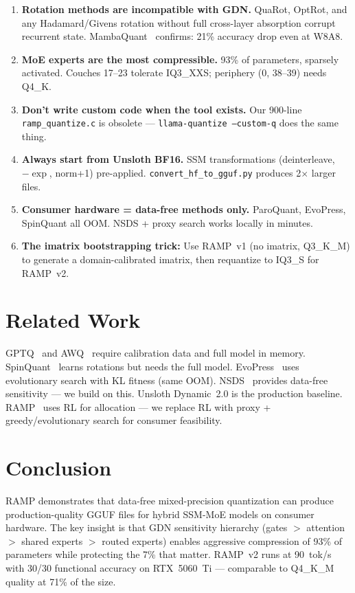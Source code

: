 \documentclass[10pt,a4paper]{article}
\begin{document}
\begin{enumerate}
  \item \textbf{Rotation methods are incompatible with GDN.} QuaRot, OptRot, and any Hadamard/Givens rotation without full cross-layer absorption corrupt recurrent state. MambaQuant~\cite{mambaquant2024} confirms: 21\% accuracy drop even at W8A8.
  \item \textbf{MoE experts are the most compressible.} 93\% of parameters, sparsely activated. Couches 17--23 tolerate IQ3\_XXS; periphery (0, 38--39) needs Q4\_K.
  \item \textbf{Don't write custom code when the tool exists.} Our 900-line \texttt{ramp\_quantize.c} is obsolete --- \texttt{llama-quantize --custom-q} does the same thing.
  \item \textbf{Always start from Unsloth BF16.} SSM transformations (deinterleave, $-\exp$, norm+1) pre-applied. \texttt{convert\_hf\_to\_gguf.py} produces 2$\times$ larger files.
  \item \textbf{Consumer hardware = data-free methods only.} ParoQuant, EvoPress, SpinQuant all OOM. NSDS + proxy search works locally in minutes.
  \item \textbf{The imatrix bootstrapping trick:} Use RAMP~v1 (no imatrix, Q3\_K\_M) to generate a domain-calibrated imatrix, then requantize to IQ3\_S for RAMP~v2.
\end{enumerate}

\section{Related Work}

GPTQ~\cite{gptq2023} and AWQ~\cite{awq2023} require calibration data and full model in memory. SpinQuant~\cite{spinquant2024} learns rotations but needs the full model. EvoPress~\cite{evopress2024} uses evolutionary search with KL fitness (same OOM). NSDS~\cite{nsds2024} provides data-free sensitivity --- we build on this. Unsloth Dynamic~2.0 is the production baseline. RAMP~\cite{ramp2024} uses RL for allocation --- we replace RL with proxy + greedy/evolutionary search for consumer feasibility.

\section{Conclusion}

RAMP demonstrates that data-free mixed-precision quantization can produce production-quality GGUF files for hybrid SSM-MoE models on consumer hardware. The key insight is that GDN sensitivity hierarchy (gates $>$ attention $>$ shared experts $>$ routed experts) enables aggressive compression of 93\% of parameters while protecting the 7\% that matter. RAMP~v2 runs at 90~tok/s with 30/30 functional accuracy on RTX~5060~Ti --- comparable to Q4\_K\_M quality at 71\% of the size.
\end{document}
